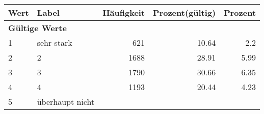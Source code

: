      \begin{longtable}{lXrrr}
     \toprule
     \textbf{Wert} & \textbf{Label} & \textbf{Häufigkeit} & \textbf{Prozent(gültig)} & \textbf{Prozent} \\
     \endhead
     \midrule
     \multicolumn{5}{l}{\textbf{Gültige Werte}}\\

     1 &
     \multicolumn{1}{X}{ sehr stark   } &


       \num{621} &
       \num[round-mode=places,round-precision=2]{10,64} &
         \num[round-mode=places,round-precision=2]{2,2} \\

     2 &
     \multicolumn{1}{X}{ 2   } &


       \num{1688} &
       \num[round-mode=places,round-precision=2]{28,91} &
         \num[round-mode=places,round-precision=2]{5,99} \\

     3 &
     \multicolumn{1}{X}{ 3   } &


       \num{1790} &
       \num[round-mode=places,round-precision=2]{30,66} &
         \num[round-mode=places,round-precision=2]{6,35} \\

     4 &
     \multicolumn{1}{X}{ 4   } &


       \num{1193} &
       \num[round-mode=places,round-precision=2]{20,44} &
         \num[round-mode=places,round-precision=2]{4,23} \\

     5 &
     \multicolumn{1}{X}{ überhaupt nicht   } &



\end{longtable}
